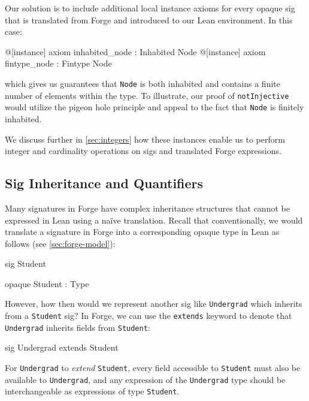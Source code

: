 Our solution is to include additional local instance axioms for every opaque sig that is translated from Forge and introduced to our Lean environment. In this case: 
\begin{lean*}
@[instance] axiom inhabited_node : Inhabited Node
@[instance] axiom fintype_node : Fintype Node
\end{lean*}
which gives us guarantees that \texttt{Node} is both inhabited and contains a finite number of elements within the type. To illustrate, our proof of \texttt{notInjective} would utilize the pigeon hole principle and appeal to the fact that \texttt{Node} is finitely inhabited. 

We discuss further in \cref{sec:integers} how these instances enable us to perform integer and cardinality operations on sigs and translated Forge expressions. 


\subsection{Sig Inheritance and Quantifiers}
Many signatures in Forge have complex inheritance structures \cite{jackson2012software} that cannot be expressed in Lean using a na\"ive translation. Recall that conventionally, we would translate a signature in Forge into a corresponding opaque type in Lean as follows (see \cref{sec:forge-model}):

\vspace{0.5em}
\noindent\begin{minipage}{0.5\textwidth}
\begin{forge*}sig Student {}\end{forge*}
\end{minipage}%
\begin{minipage}{0.5\textwidth}
\begin{lean*}opaque Student : Type\end{lean*}
\end{minipage}
\vspace{0.5em}

However, how then would we represent another sig like \texttt{Undergrad} which inherits from a \texttt{Student} sig? In Forge, we can use the \texttt{extends} keyword to denote that \texttt{Undergrad} inherits fields from \texttt{Student}: 
\begin{forge*}
sig Undergrad extends Student {}
\end{forge*}

For \texttt{Undergrad} to \emph{extend} \texttt{Student}, every field accessible to \texttt{Student} must also be available to \texttt{Undergrad}, and any expression of the \texttt{Undergrad} type should be interchangeable as expressions of type \texttt{Student}. 

